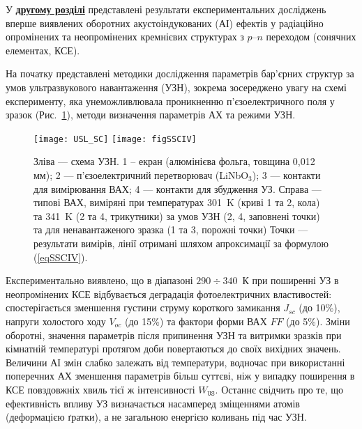 \documentclass[a5paper,10pt,twoside,openany,article]{memoir} %
\begin{document}
\mainmatter                   %


У  \underline{\textbf{другому розділі}} представлені результати експериментальних досліджень вперше виявлених оборотних акустоіндукованих (АІ) ефектів у радіаційно опромінених та неопромінених кремнієвих структурах з  $p$--$n$ переходом (сонячних елементах, КСЕ).

На початку представлені методики дослідження параметрів бар'єрних структур за умов ультразвукового навантаження (УЗН),
зокрема зосереджено увагу на схемі експерименту, яка унеможливлювала проникненню п'єзоелектричного поля у зразок (Рис.~\ref{USL_SC}), методи визначення параметрів АХ та режими УЗН.


\begin{figure}[ht]
\center
\texttt{[image: USL\_SC]} \hfill
\texttt{[image: figSSCIV]}
\caption{\label{USL_SC}
Зліва --- схема УЗН.
1 --  екран (алюмінієва фольга, товщина 0,012 мм);
2 --- п'єзоелектричний перетворювач (LiNbO$_3$);
3 --- контакти для вимірювання ВАХ;
4 --- контакти для збудження УЗ.
Справа --- типові ВАХ, виміряні при температурах 301~K (криві 1 та 2, кола) та 341~K (2 та 4, трикутники)
за умов УЗН (2, 4, заповнені точки) та для ненавантаженого зразка (1 та 3, порожні точки)
Точки --- результати вимірів, лінії отримані шляхом апроксимації за формулою (\ref{eqSSCIV}).
}%
\end{figure}

Експериментально виявлено, що в діапазоні $290\div340$~К при поширенні УЗ в неопромінених КСЕ відбувається деградація
фотоелектричних властивостей:
спостерігається зменшення густини струму короткого замикання $J_{sc}$ (до 10\%), напруги холостого ходу $V_{oc}$ (до 15\%) та фактори форми ВАХ $F\!F$ (до 5\%).
Зміни оборотні, значення параметрів  після припинення УЗН  та витримки зразків при кімнатній температурі протягом доби повертаються до своїх вихідних значень.
Величини АІ змін слабко залежать від температури, водночас при використанні поперечних АХ зменшення параметрів більш суттєві, ніж у випадку поширення в КСЕ повздовжніх хвиль тієї ж інтенсивності $W_\mathtt{US}$.
Останнє свідчить про те, що ефективність впливу УЗ визначається насамперед зміщеннями атомів (деформацією ґратки), а не загальною енергією коливань під час УЗН.
\end{document}
